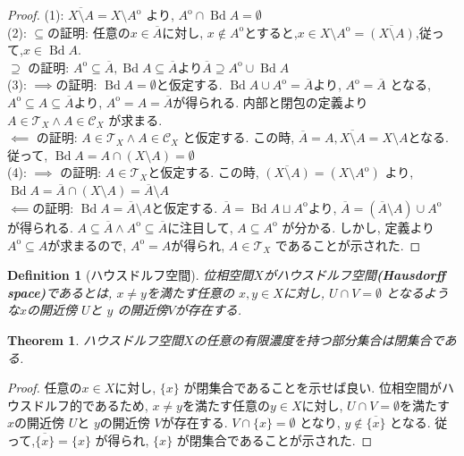 \documentclass[dvipdfmx]{jbook}
\newcommand{\cl}[1]{\overline{ #1}  }
\newcommand{\Int}[1]{#1 ^{\mathrm{o}} }
\newcommand{\bd}[1]{\operatorname{Bd}{#1}}
\newtheorem{theorem}{Theorem}[section]
\newtheorem{definition}{Definition}[section]
\theoremstyle{remark}
\theoremstyle{plain}
\begin{document}
\begin{proof}
	(1): $\cl{X\setminus A}= X\setminus \Int{ A }$ より, $\Int{A} \cap \bd{A}= \emptyset$\\
	(2): $\subseteq$の証明: 任意の$x \in \cl{A}$に対し,  $x \not\in \Int{A}$とすると,$ x \in X \setminus \Int{A} = \cl{\left( X \setminus A \right) }$,従って,$x \in \bd{A}.$\\
	$\supseteq$ の証明: $\Int{A} \subseteq \cl{A}, \bd{A} \subseteq \cl{A}$より$\cl{A} \supseteq \Int{A} \cup \bd{A}$ \\
	(3): $\implies$の証明: $\bd{A} = \emptyset$と仮定する. $\bd{A} \cup \Int{A} = \cl{A} $より,  $\Int{A} = \cl{A}$ となる, $\Int{A} \subseteq A \subseteq \cl{A}$より, $\Int{A} =A = \cl{A}$が得られる. 内部と閉包の定義より $A \in \mathcal{T}_X \land A \in \mathcal{C}_X$ が求まる.\\
	$\impliedby$ の証明: $A \in \mathcal{T}_X \land A \in \mathcal{C}_X$ と仮定する. この時, $\cl{A} = A, \cl{X\setminus A } = X \setminus A$となる.
	従って, $\bd{A} = A \cap \left( X \setminus A \right) = \emptyset$ \\
	(4): $\implies$ の証明: $A \in \mathcal{T}_X $と仮定する. この時, $\cl{\left( X \setminus A \right) } = \left( X \setminus \Int A \right)  $ より, $\bd{A} = \cl{A} \cap \left( X \setminus A \right) = \cl{A} \setminus A$ \\
	$\impliedby$の証明: $\bd{A} = \cl{A} \setminus A$と仮定する. 
	$\cl{A} = \bd{A} \sqcup \Int{A}$より, $\cl{A} = \left( \cl{A} \setminus A  \right) \cup \Int{A}$ が得られる. 
	$A \subseteq \cl{A} \land \Int{A} \subseteq \cl{A}$に注目して,  $ A \subseteq  \Int{A} $ が分かる. 
	しかし, 定義より$\Int{A} \subseteq A$が求まるので,  $\Int{A} = A$が得られ,  $A \in \mathcal{T}_X$ であることが示された.
	
\end{proof}

\begin{definition}[ハウスドルフ空間]
	位相空間$X$がハウスドルフ空間\textbf{(Hausdorff space)}であるとは, $x\neq y$を満たす任意の $x,y \in X$に対し,  $U \cap V = \emptyset $ となるような$x$の開近傍 $U$と $y$ の開近傍$V$が存在する.
\end{definition}

\begin{theorem}
	ハウスドルフ空間$X$の任意の有限濃度を持つ部分集合は閉集合である.
\end{theorem}

\begin{proof}
	任意の$x \in X$に対し,  $\{x\} $ が閉集合であることを示せば良い.
	位相空間がハウスドルフ的であるため, $x \neq y$を満たす任意の$y \in X$に対し,  $U \cap V =\emptyset$を満たす $x$の開近傍 $U$と $y$の開近傍 $V$が存在する.
	$V \cap \{x\} = \emptyset $ となり, $y \not\in \cl{\{x\} } $ となる. 
	従って,$\cl{\{x\} } = \{x\}  $ が得られ, $\{x\} $ が閉集合であることが示された.
\end{proof}
\end{document}
